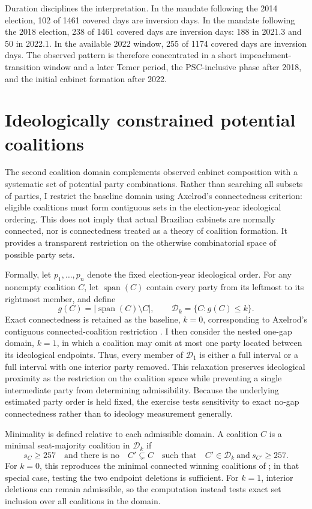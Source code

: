 \documentclass[11pt]{article}
\begin{document}
Duration disciplines the interpretation. In the mandate following the 2014
election, 102 of 1461 covered days are inversion days. In the mandate following
the 2018 election, 238 of 1461 covered days are inversion days: 188 in 2021.3
and 50 in 2022.1. In the available 2022 window, 255 of 1174 covered days are
inversion days. The observed pattern is therefore concentrated in a short
impeachment-transition window and a later Temer period, the PSC-inclusive phase
after 2018, and the initial cabinet formation after 2022.


\section{Ideologically constrained potential coalitions}
\label{sec:ideology}
The second coalition domain complements observed cabinet composition with a
systematic set of potential party combinations. Rather than searching all
subsets of parties, I restrict the baseline domain using Axelrod's connectedness
criterion: eligible coalitions must form contiguous sets in the election-year
ideological ordering. This does not imply that actual Brazilian cabinets are
normally connected, nor is connectedness treated as a theory of coalition
formation. It provides a transparent restriction on the otherwise combinatorial
space of possible party sets.

Formally, let \(p_1,\ldots,p_n\) denote the fixed election-year ideological
order. For any nonempty coalition \(C\), let \(\operatorname{span}(C)\) contain
every party from its leftmost to its rightmost member, and define
\[
g(C)=\lvert \operatorname{span}(C)\setminus C\rvert,
\qquad
\mathcal D_k=\{C:g(C)\leq k\}.
\]
Exact connectedness is retained as the baseline, \(k=0\), corresponding to
Axelrod's contiguous connected-coalition restriction
\parencite{axelrod1970conflict}. I then consider the nested one-gap domain,
\(k=1\), in which a coalition may omit at most one party located between its
ideological endpoints. Thus, every member of \(\mathcal D_1\) is either a full
interval or a full interval with one interior party removed. This relaxation
preserves ideological proximity as the restriction on the coalition space while
preventing a single intermediate party from determining admissibility. Because
the underlying estimated party order is held fixed, the exercise tests
sensitivity to exact no-gap connectedness rather than to ideology measurement
generally.

Minimality is defined relative to each admissible domain. A coalition \(C\) is
a minimal seat-majority coalition in \(\mathcal D_k\) if
\[
s_C\geq257
\quad\text{and there is no}\quad
C'\subsetneq C
\quad\text{such that}\quad
C'\in\mathcal D_k\ \text{and}\ s_{C'}\geq257.
\]
For \(k=0\), this reproduces the minimal connected winning coalitions of
\textcite{axelrod1970conflict}; in that special case, testing the two endpoint
deletions is sufficient. For \(k=1\), interior deletions can remain admissible,
so the computation instead tests exact set inclusion over all coalitions in the
domain.
\end{document}
